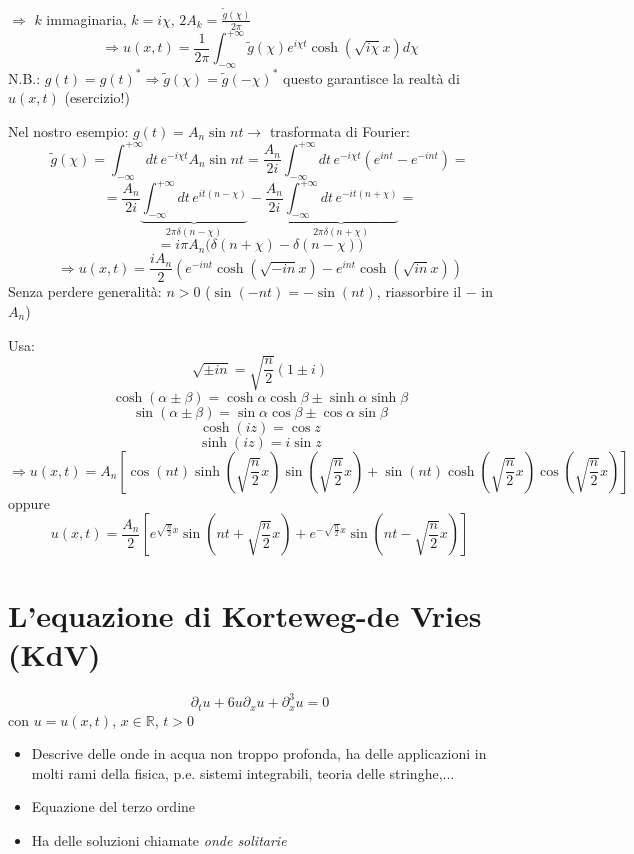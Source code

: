 \documentclass[a4paper,11pt]{report}
\newcommand{\R}{\mathbb{R}}
\begin{document}
$\Rightarrow$ $k$ immaginaria, $k=i\chi$, $2A_k = \frac{\tilde{g}(\chi)}{2\pi}$
\[
\Rightarrow u(x,t) =\frac{1}{2\pi}\int_{-\infty}^{+\infty}\tilde{g}(\chi)e^{i\chi t}\cosh(\sqrt{i\chi}x) d\chi
\]
N.B.: $g(t)=g(t)^* \Rightarrow \tilde{g}(\chi)=\tilde{g}(-\chi)^*$ questo garantisce la realt\`a di $u(x,t)$ (esercizio!)

Nel nostro esempio: $g(t)=A_n\sin nt\rightarrow$ trasformata di Fourier:
\[
\tilde{g}(\chi)=\int_{-\infty}^{+\infty}dt \, e^{-i\chi t}A_n \sin nt = \frac{A_n}{2i}\int_{-\infty}^{+\infty}dt \, e^{-i\chi t}\left(e^{int}-e^{-int}\right)=
\]
\[
=\frac{A_n}{2i}\underbrace{\int_{-\infty}^{+\infty} dt \, e^{it(n-\chi)}}_{2\pi \delta(n-\chi)} -\frac{A_n}{2i}\underbrace{\int_{-\infty}^{+\infty} dt \, e^{-it(n+\chi)}}_{2\pi \delta(n+\chi)} = 
\]
\[
=i\pi A_n\big(\delta(n+\chi)-\delta(n-\chi)\big)
\]
\[
\Rightarrow u(x,t)=\frac{iA_n}{2}\left(e^{-int}\cosh(\sqrt{-in}x) - e^{int}\cosh(\sqrt{in}x)\right)
\]
Senza perdere generalit\`a: $n>0$ ($\sin(-nt)=-\sin(nt)$, riassorbire il $-$ in $A_n$)

Usa:
\[
\sqrt{\pm in} =\sqrt{\frac{n}{2}}(1\pm i)
\]
\[
\cosh(\alpha \pm \beta)=\cosh \alpha \cosh \beta \pm \sinh \alpha \sinh \beta
\]
\[
\sin(\alpha \pm \beta)=\sin \alpha \cos \beta \pm \cos \alpha \sin \beta 
\]
\[
\cosh(iz)=\cos z
\]
\[
\sinh(iz)=i\sin z
\]
\[
\Rightarrow u(x,t)=A_n\left[\cos (nt) \sinh \left(\sqrt{\frac{n}{2}}x \right)\sin \left(\sqrt{\frac{n}{2}}x \right) + \sin (nt) \cosh \left(\sqrt{\frac{n}{2}}x \right) \cos \left(\sqrt{\frac{n}{2}}x \right)\right]
\]
oppure
\[
u(x,t)=\frac{A_n}{2}\left[e^{\sqrt{\frac{n}{2}}x}\sin\left(nt+\sqrt{\frac{n}{2}}x\right) + e^{-\sqrt{\frac{n}{2}}x}\sin\left(nt-\sqrt{\frac{n}{2}}x  \right) \right]
\]

\section{L'equazione di Korteweg-de Vries (KdV)}

\begin{equation}
\partial_t u + 6u\partial_xu+\partial^3_x u=0
\label{2.179}
\end{equation}
con $u=u(x,t)$, $x\in \R$, $t>0$
\begin{itemize}
\item Descrive delle onde in acqua non troppo profonda, ha delle applicazioni in molti rami della fisica, p.e. sistemi integrabili, teoria delle stringhe,...
\item Equazione del terzo ordine
\item Ha delle soluzioni chiamate \emph{onde solitarie}
\end{itemize}
\end{document}
